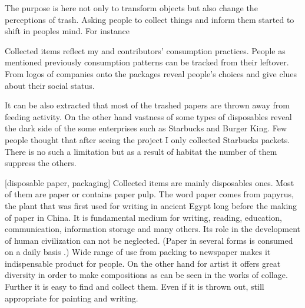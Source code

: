 

The purpose is here not only to transform objects but also change the perceptions of trash. Asking people to collect things and inform them started to shift in peoples mind. For instance 

Collected items reflect my and contributors' consumption practices. People as mentioned previously consumption patterns can be tracked from their leftover. From logos of companies onto the packages reveal people's choices and give clues about their social status.

It can be also extracted that most of the trashed papers are thrown away from feeding activity. On the other hand vastness of some types of disposables reveal the dark side of the some enterprises such as Starbucks and Burger King. Few people thought that after seeing the project I only collected Starbucks packets. There is no such a limitation but as a result of habitat the number of them suppress the others.

[disposable paper, packaging]
Collected items are mainly disposables ones. Most of them are paper or contains paper pulp. The word paper comes from papyrus, the plant that was first used for writing in ancient Egypt long before the making of paper in China. It is fundamental medium for writing, reading, education, communication, information storage and many others. Its role in the development of human civilization can not be neglected. (Paper in several forms is consumed on a daily basis \cite{trafford2012paper}.) Wide range of use from packing to newspaper makes it indispensable product for people. On the other hand for artist it offers great diversity in order to make compositions as can be seen in the works of collage. Further it is easy to find and collect them. Even if it is thrown out, still appropriate for painting and writing.


